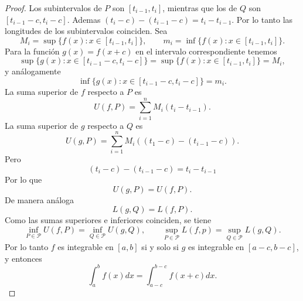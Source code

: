 \documentclass[12pt,a4paper]{article}
\begin{document}
    \begin{proof}
        Los subintervalos de $P$ son $[t_{i-1},t_{i}]$, mientras que los de $Q$ son
        $[t_{i-1}-c,t_{i}-c]$. Ademas $(t_{i}-c)-(t_{i-1}-c)=t_{i}-t_{i-1}$. Por lo tanto
        las longitudes de los subintervalos coinciden. Sea
        \begin{equation*}
            M_{i}=\sup\{f(x):x\in[t_{i-1},t_{i}]\},\qquad m_{i}=\inf\{f(x):x\in[t_{i-1},t_{i}]\}.
        \end{equation*}
        Para la función $g(x)=f(x+c)$ en el intervalo correspondiente tenemos
        \begin{equation*}
            \sup\{g(x):x\in[t_{i-1}-c,t_{i}-c]\}=\sup\{f(x):x\in[t_{i-1},t_{i}]\}=M_{i},
        \end{equation*}
        y análogamente
        \begin{equation*}
            \inf\{g(x):x\in[t_{i-1}-c,t_{i}-c]\}=m_{i}.
        \end{equation*}
        La suma superior de $f$ respecto a $P$ es
        \begin{equation*}
            U(f,P)=\sum_{i=1}^{n}M_{i}(t_{i}-t_{i-1}).
        \end{equation*}
        La suma superior de $g$ respecto a $Q$ es
        \begin{equation*}
            U(g,P)=\sum_{i=1}^{n}M_{i}((t_{1}-c)-(t_{i-1}-c)).
        \end{equation*}
        Pero
        \begin{equation*}
            (t_{i}-c)-(t_{i-1}-c)=t_{i}-t_{i-1}
        \end{equation*}
        Por lo que
        \begin{equation*}
            U(g,P)=U(f,P).
        \end{equation*}
        De manera análoga
        \begin{equation*}
            L(g,Q)=L(f,P).
        \end{equation*}
        Como las sumas superiores e inferiores coinciden, se tiene
        \begin{equation*}
            \inf_{P\in\mathcal{P}}U(f,P)=\inf_{Q\in\mathcal{P}}U(g,Q),\qquad \sup_{P\in\mathcal{P}}L(f,p)=\sup_{Q\in\mathcal{P}}L(g,Q).
        \end{equation*}
        Por lo tanto $f$ es integrable en $[a,b]$ si y solo si $g$ es integrable en $[a-c,b-c]$, y entonces
        \begin{equation*}
            \int_{a}^{b}f(x)dx=\int_{a-c}^{b-c}f(x+c)dx.
        \end{equation*}
    \end{proof}
\end{document}
